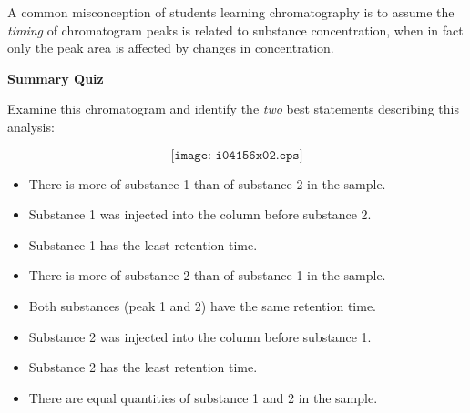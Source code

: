 \vskip 10pt

A common misconception of students learning chromatography is to assume the {\it timing} of chromatogram peaks is related to substance concentration, when in fact only the peak area is affected by changes in concentration.









\vfil \eject

\noindent
{\bf Summary Quiz}

Examine this chromatogram and identify the {\it two} best statements describing this analysis:

$$\texttt{[image: i04156x02.eps]}$$

\begin{itemize}
\item{} There is more of substance 1 than of substance 2 in the sample.
\vskip 5pt
\item{} Substance 1 was injected into the column before substance 2.
\vskip 5pt
\item{} Substance 1 has the least retention time.
\vskip 5pt
\item{} There is more of substance 2 than of substance 1 in the sample.
\vskip 5pt
\item{} Both substances (peak 1 and 2) have the same retention time.
\vskip 5pt
\item{} Substance 2 was injected into the column before substance 1. 
\vskip 5pt
\item{} Substance 2 has the least retention time.
\vskip 5pt
\item{} There are equal quantities of substance 1 and 2 in the sample.
\end{itemize}





